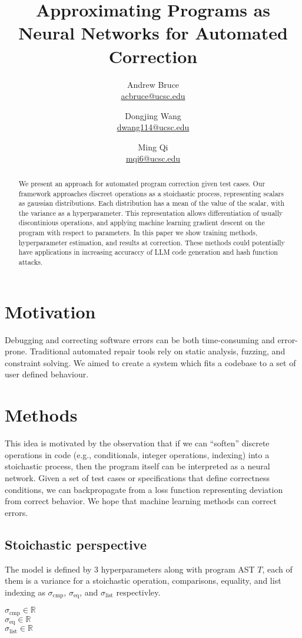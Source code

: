 \documentclass{article}
\title{Approximating Programs as Neural Networks for Automated Correction}
\author{
  Andrew Bruce \\ \href{mailto:acbruce@ucsc.edu}{acbruce@ucsc.edu}
  \and
  Dongjing Wang \\ \href{mailto:dwang114@ucsc.edu}{dwang114@ucsc.edu}
  \and
  Ming Qi \\ \href{mailto:mqi6@ucsc.edu}{mqi6@ucsc.edu}
}
\begin{document}
\maketitle

\begin{abstract}
  We present an approach for automated program correction given test cases. Our framework approaches discreet operations as a stoichastic process, representing scalars as gaussian distributions. Each distribution has a mean of the value of the scalar, with the variance as a hyperparameter. This representation allows differentiation of usually discontinious operations, and applying machine learning gradient descent on the program with respect to parameters. In this paper we show training methods, hyperparameter estimation, and results at correction. These methods could potentially have applications in increasing accuraccy of LLM code generation and hash function attacks.
\end{abstract}

\section*{Motivation}
Debugging and correcting software errors can be both time-consuming and error-prone. Traditional automated repair tools rely on static analysis, fuzzing, and constraint solving. We aimed to create a system which fits a codebase to a set of user defined behaviour.
\section*{Methods}
This idea is motivated by the observation that if we can ``soften'' discrete operations in code (e.g., conditionals, integer operations, indexing) into a stoichastic process, then the program itself can be interpreted as a neural network. Given a set of test cases or specifications that define correctness conditions, we can backpropagate from a loss function representing deviation from correct behavior. We hope that machine learning methods can correct errors.
\subsection*{Stoichastic perspective}
The model is defined by 3 hyperparameters along with program AST $T$, each of them is a variance for a stoichastic operation, comparisons, equality, and list indexing as $\sigma_{\text{cmp}}$, $\sigma_{\text{eq}}$, and $\sigma_{\text{list}}$ respectivley.
\begin{center}
  $\sigma_{\text{cmp}} \in \mathbb{R}$\\
  $\sigma_{\text{eq}} \in \mathbb{R}$\\
  $\sigma_{\text{list}} \in \mathbb{R}$
\end{center}
\end{document}
